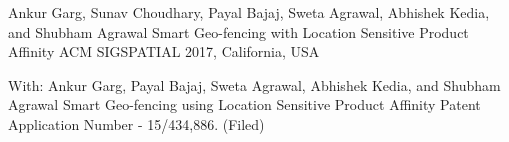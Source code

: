 
\begin{cventries}
	\cventry
		{Ankur Garg, Sunav Choudhary, Payal Bajaj, Sweta Agrawal, Abhishek Kedia, and Shubham Agrawal}
		{Smart Geo-fencing with Location Sensitive Product Affinity}
		{}
		{}
		{ACM SIGSPATIAL 2017, California, USA}
\end{cventries}

\begin{cventries}	
	\cventry
		{With: Ankur Garg, Payal Bajaj, Sweta Agrawal, Abhishek Kedia, and Shubham Agrawal}
		{Smart Geo-fencing using Location Sensitive Product Affinity}
		{}
		{}
		{Patent Application Number - 15/434,886. (Filed)}
\end{cventries}
%
%
%
%	
%	
%	
